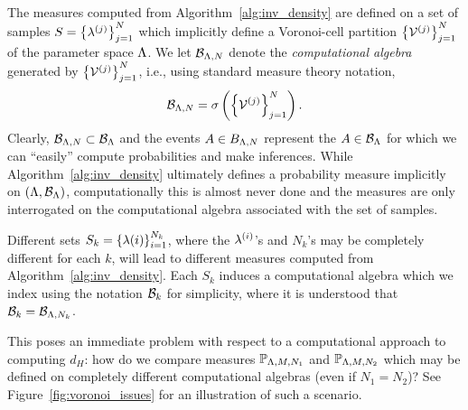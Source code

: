 The measures computed from Algorithm~\ref{alg:inv_density} are defined on a set of samples $S = \left\{\lambda^{(j)}\right\}_{j=1}^{N}$ which implicitly define a Voronoi-cell partition $\left\{\mathcal{V}^{(j)}\right\}_{j=1}^{N}$ of the parameter space ${\Lambda}$.
We let $\mathcal{B}_{{\Lambda}, N}$ denote the \emph{computational algebra} generated by $\left\{\mathcal{V}^{(j)}\right\}_{j=1}^{N}$, i.e., using standard measure theory notation,
$$
	\mathcal{B}_{{\Lambda},N} = \sigma\left(\left\{\mathcal{V}^{(j)}\right\}_{j=1}^{N}\right).
$$
Clearly, $\mathcal{B}_{{\Lambda}, N}\subset \mathcal{B}_{\Lambda}$ and the events $A\in B_{{\Lambda}, N}$ represent the $A\in\mathcal{B}_{\Lambda}$ for which we can ``easily'' compute probabilities and make inferences.
While Algorithm~\ref{alg:inv_density} ultimately defines a probability measure implicitly on $({\Lambda},\mathcal{B}_{\Lambda})$, computationally this is almost never done and the measures are only interrogated on the computational algebra associated with the set of samples.

Different sets $S_k = \left\{\lambda{(i)}\right\}_{i=1}^{N_k}$, where the $\lambda^{(i)}$'s and $N_k$'s may be completely different for each $k$, will lead to different measures computed from Algorithm~\ref{alg:inv_density}.
Each $S_k$ induces a computational algebra which we index using the notation $\mathcal{B}_{k}$ for simplicity, where it is understood that $\mathcal{B}_k = \mathcal{B}_{{\Lambda}, N_k}$.

This poses an immediate problem with respect to a computational approach to computing $d_H$: how do we compare measures $\mathbb{P}_{{\Lambda}, M, N_1}$ and $\mathbb{P}_{{\Lambda}, M, N_2}$ which may be defined on completely different computational algebras (even if $N_1=N_2$)?
See Figure~\ref{fig:voronoi_issues} for an illustration of such a scenario.

